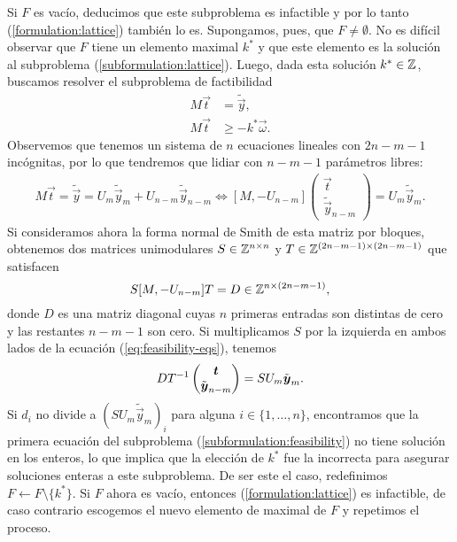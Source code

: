 Si $F$ es vacío, deducimos que este subproblema es infactible y por lo tanto
(\ref{formulation:lattice}) también lo es. Supongamos, pues, que $F \neq \emptyset$. No es difícil
observar que $F$ tiene un elemento maximal $k^*$ y que este elemento es la solución al subproblema
(\ref{subformulation:lattice}). Luego, dada esta solución $k^* \in \mathbb{Z}$, buscamos resolver el
subproblema de factibilidad
\begin{subequations}
	\label{subformulation:feasibility}
	\begin{align}
		M\vec{t} &= \tilde{\vec{y}}, \\
		M\vec{t} &\geq -k^*\vec{\omega}.
	\end{align}
\end{subequations}
Observemos que tenemos un sistema de $n$ ecuaciones lineales con $2n - m - 1$ incógnitas, por lo que
tendremos que lidiar con $n - m - 1$ parámetros libres:
\begin{align}
	\label{eq:feasibility-eqs}
	M\vec{t} = \tilde{\vec{y}} = U_m\tilde{\vec{y}}_m + U_{n-m}\tilde{\vec{y}}_{n-m}
   \iff [M, -U_{n-m}] \begin{pmatrix} \vec{t} \\ \tilde{\vec{y}}_{n-m} \end{pmatrix} = U_m\tilde{\vec{y}}_m.
\end{align}
Si consideramos ahora la forma normal de Smith de esta matriz por bloques, obtenemos dos matrices
unimodulares $S \in \mathbb{Z}^{n \times n}$ y $T \in \mathbb{Z}^{(2n - m - 1) \times (2n - m -1)}$ que satisfacen
\begin{equation*}
	S[M, -U_{n-m}]T = D \in \mathbb{Z}^{n \times (2n - m - 1)},
\end{equation*}
donde $D$ es una matriz diagonal cuyas $n$ primeras entradas son distintas de cero y las restantes
$n - m - 1$ son cero. Si multiplicamos $S$ por la izquierda en ambos lados de la ecuación
(\ref{eq:feasibility-eqs}), tenemos
\begin{equation*}
	DT^{-1}\begin{pmatrix} \boldsymbol{t} \\ \tilde{\boldsymbol{y}}_{n-m} \end{pmatrix}
	= SU_m\tilde{\boldsymbol{y}}_{m}.
\end{equation*}
Si $d_i$ no divide a $(SU_m\tilde{\vec{y}}_{m})_i$ para alguna $i \in \lbrace 1, \ldots, n \rbrace$,
encontramos que la primera ecuación del subproblema (\ref{subformulation:feasibility}) no tiene
solución en los enteros, lo que implica que la elección de $k^*$ fue la incorrecta para asegurar
soluciones enteras a este subproblema. De ser este el caso, redefinimos $F \leftarrow F \setminus
\lbrace k^* \rbrace$. Si $F$ ahora es vacío, entonces (\ref{formulation:lattice}) es
infactible, de caso contrario escogemos el nuevo elemento de maximal de $F$ y repetimos el proceso.

